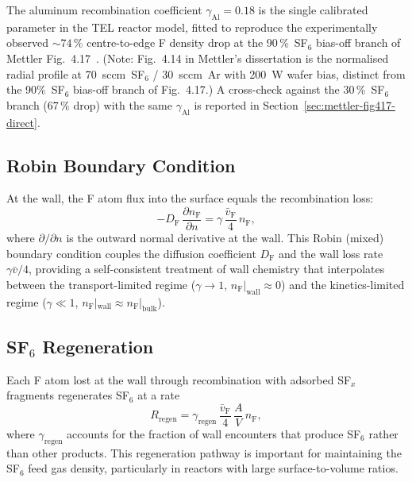 \documentclass[11pt,a4paper]{report}
\begin{document}
The aluminum recombination coefficient $\gamma_\mathrm{Al} = 0.18$ is the single calibrated parameter in the TEL reactor model, fitted to reproduce the experimentally observed $\sim 74\,\%$ centre-to-edge F density drop at the 90\,\%~SF$_6$ bias-off branch of Mettler Fig.~4.17~\cite{Mettler2025}.  (Note: Fig.~4.14 in Mettler's dissertation is the normalised radial profile at 70~sccm~SF$_6$ / 30~sccm~Ar with 200~W wafer bias, distinct from the 90\%~SF$_6$ bias-off branch of Fig.~4.17.)  A cross-check against the 30\,\%~SF$_6$ branch (67\,\% drop) with the same $\gamma_\mathrm{Al}$ is reported in Section~\ref{sec:mettler-fig417-direct}.

\subsection{Robin Boundary Condition}

At the wall, the F atom flux into the surface equals the recombination loss:
\begin{equation}
  \boxed{-D_\mathrm{F}\,\frac{\partial n_\mathrm{F}}{\partial n} = \gamma\,\frac{\bar{v}_\mathrm{F}}{4}\,n_\mathrm{F},}
  \label{eq:robin-bc}
\end{equation}
where $\partial/\partial n$ is the outward normal derivative at the wall.  This Robin (mixed) boundary condition couples the diffusion coefficient $D_\mathrm{F}$ and the wall loss rate $\gamma\bar{v}/4$, providing a self-consistent treatment of wall chemistry that interpolates between the transport-limited regime ($\gamma \to 1$, $n_\mathrm{F}|_\mathrm{wall} \approx 0$) and the kinetics-limited regime ($\gamma \ll 1$, $n_\mathrm{F}|_\mathrm{wall} \approx n_\mathrm{F}|_\mathrm{bulk}$).

\subsection{SF$_6$ Regeneration}

Each F atom lost at the wall through recombination with adsorbed SF$_x$ fragments regenerates SF$_6$ at a rate
\begin{equation}
  R_\mathrm{regen} = \gamma_\mathrm{regen}\,\frac{\bar{v}_\mathrm{F}}{4}\,\frac{A}{V}\,n_\mathrm{F},
\end{equation}
where $\gamma_\mathrm{regen}$ accounts for the fraction of wall encounters that produce SF$_6$ rather than other products.  This regeneration pathway is important for maintaining the SF$_6$ feed gas density, particularly in reactors with large surface-to-volume ratios.
\end{document}

